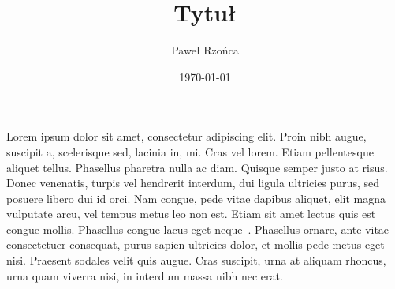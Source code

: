 \documentclass[a4paper; 11pt]{article}
\title{Tytuł}
\author{Paweł Rzońca}
\date{\today}
\begin{document}
\maketitle

Lorem ipsum dolor sit amet, consectetur adipiscing elit. 
Proin nibh augue, suscipit a, scelerisque sed, lacinia in, mi. 
Cras vel lorem. Etiam pellentesque aliquet tellus. Phasellus pharetra 
nulla ac diam. Quisque semper justo at risus. 
Donec venenatis, turpis vel hendrerit interdum, dui ligula ultricies purus, 
sed posuere libero dui id orci. Nam congue, pede vitae dapibus aliquet, 
elit magna vulputate arcu, vel tempus metus leo non est. 
Etiam sit amet lectus quis est congue mollis. 
Phasellus congue lacus eget neque~\cite{x}.
Phasellus ornare, ante vitae consectetuer consequat, purus sapien 
ultricies dolor, et mollis pede metus eget nisi. 
Praesent sodales velit quis augue. Cras suscipit, urna at aliquam rhoncus, 
urna quam viverra nisi, in interdum massa nibh nec erat.


\printbibliography
\end{document}
